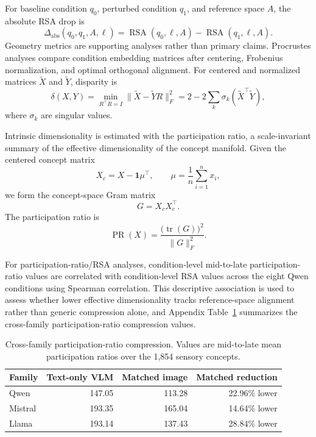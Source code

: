 \documentclass{article}
\begin{document}
For baseline condition \(q_0\), perturbed condition \(q_1\), and reference space \(A\), the absolute RSA drop is
\begin{equation}
  \Delta_{\mathrm{abs}}(q_0,q_1,A,\ell)=
  \operatorname{RSA}(q_0,\ell,A)-\operatorname{RSA}(q_1,\ell,A).
  \label{eq:appendix_abs_drop}
\end{equation}
Geometry metrics are supporting analyses rather than primary claims. Procrustes analyses compare condition embedding matrices after centering, Frobenius normalization, and optimal orthogonal alignment. For centered and normalized matrices \(\tilde X\) and \(\tilde Y\), disparity is
\begin{equation}
  \delta(X,Y)=\min_{R^\top R=I}\|\tilde X-\tilde YR\|_F^2
  =2-2\sum_k \sigma_k(\tilde X^\top\tilde Y),
  \label{eq:appendix_procrustes}
\end{equation}
where \(\sigma_k\) are singular values.

Intrinsic dimensionality is estimated with the participation ratio, a scale-invariant summary of the effective dimensionality of the concept manifold. Given the centered concept matrix
\begin{equation}
  X_c = X - \mathbf{1}\mu^\top, \qquad
  \mu = \frac{1}{n}\sum_{i=1}^n x_i,
  \label{eq:appendix_centered_matrix}
\end{equation}
we form the concept-space Gram matrix
\begin{equation}
  G = X_c X_c^\top.
  \label{eq:appendix_gram_matrix}
\end{equation}
The participation ratio is
\begin{equation}
  \operatorname{PR}(X)=
  \frac{\bigl(\operatorname{tr}(G)\bigr)^2}{\|G\|_F^2}.
  \label{eq:appendix_pr}
\end{equation}

For participation-ratio/RSA analyses, condition-level mid-to-late participation-ratio values are correlated with condition-level RSA values across the eight Qwen conditions using Spearman correlation. This descriptive association is used to assess whether lower effective dimensionality tracks reference-space alignment rather than generic compression alone, and Appendix Table~\ref{tab:appendix_cross_family_pr} summarizes the cross-family participation-ratio compression values.

\begin{table}[!htbp]
\centering
\caption{Cross-family participation-ratio compression. Values are mid-to-late mean participation ratios over the 1,854 sensory concepts.}
\label{tab:appendix_cross_family_pr}
\small
\begin{tabular}{lrrr}
  \toprule
  Family & Text-only VLM & Matched image & Matched reduction \\
  \midrule
  Qwen & 147.05 & 113.28 & 22.96\% lower \\
  Mistral & 193.35 & 165.04 & 14.64\% lower \\
  Llama & 193.14 & 137.43 & 28.84\% lower \\
  \bottomrule
\end{tabular}
\end{table}
\end{document}
